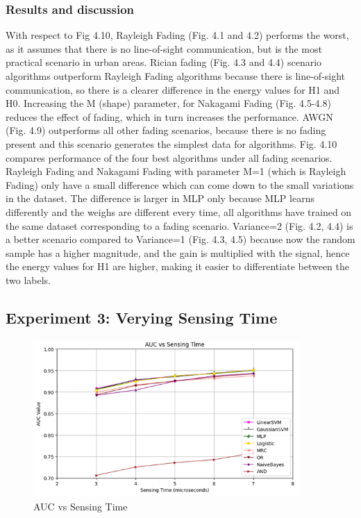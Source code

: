\subsubsection{Results and discussion}
With respect to Fig 4.10, Rayleigh Fading (Fig. 4.1 and 4.2) performs the worst, as it assumes that there is no line-of-sight communication, but is the most practical scenario in urban areas. Rician fading (Fig. 4.3 and 4.4) scenario algorithms outperform Rayleigh Fading algorithms because there is line-of-sight communication, so there is a clearer difference in the energy values for H1 and H0. Increasing the M (shape) parameter, for Nakagami Fading (Fig. 4.5-4.8) reduces the effect of fading, which in turn increases the performance. AWGN (Fig. 4.9) outperforms all other fading scenarios, because there is no fading present and this scenario generates the simplest data for algorithms. Fig. 4.10 compares performance of the four best algorithms under all fading scenarios. Rayleigh Fading and Nakagami Fading with parameter M=1 (which is Rayleigh Fading) only have a small difference which can come down to the small variations in the dataset. The difference is larger in MLP only because MLP learns differently and the weighs are different every time, all algorithms have trained on the same dataset corresponding to a fading scenario. Variance=2 (Fig. 4.2, 4.4) is a better scenario compared to Variance=1 (Fig. 4.3, 4.5) because now the random sample has a higher magnitude, and the gain is multiplied with the signal, hence the energy values for H1 are higher, making it easier to differentiate between the two labels.

\subsection{Experiment 3: Verying Sensing Time}

\begin{figure}
  \begin{center}
  \includegraphics[width=0.9\textwidth]{figs/11.png}
  \end{center}
  \caption{AUC vs Sensing Time}
\end{figure}

